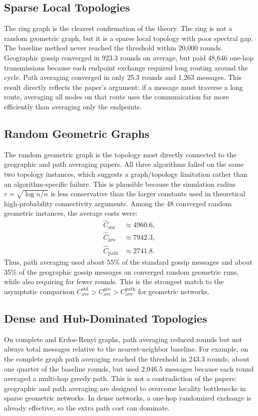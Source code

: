 \documentclass[conference]{IEEEtran}
\begin{document}
\subsection{Sparse Local Topologies}
The ring graph is the clearest confirmation of the theory. The ring is not a random geometric graph, but it is a sparse local topology with poor spectral gap. The baseline method never reached the threshold within 20,000 rounds. Geographic gossip converged in 923.3 rounds on average, but paid 48,646 one-hop transmissions because each endpoint exchange required long routing around the cycle. Path averaging converged in only 25.3 rounds and 1,263 messages. This result directly reflects the paper's argument: if a message must traverse a long route, averaging all nodes on that route uses the communication far more efficiently than averaging only the endpoints.

\subsection{Random Geometric Graphs}
The random geometric graph is the topology most directly connected to the geographic and path averaging papers. All three algorithms failed on the same two topology instances, which suggests a graph/topology limitation rather than an algorithm-specific failure. This is plausible because the simulation radius $r=\sqrt{\log n/n}$ is less conservative than the larger constants used in theoretical high-probability connectivity arguments. Among the 48 converged random geometric instances, the average costs were:
\begin{equation}
\begin{aligned}
\widehat{C}_{\mathrm{std}} &\approx 4960.6,\\
\widehat{C}_{\mathrm{geo}} &\approx 7942.3,\\
\widehat{C}_{\mathrm{path}} &\approx 2741.8.
\end{aligned}
\end{equation}
Thus, path averaging used about 55\% of the standard gossip messages and about 35\% of the geographic gossip messages on converged random geometric runs, while also requiring far fewer rounds. This is the strongest match to the asymptotic comparison $C_{\mathrm{ave}}^{\mathrm{std}} > C_{\mathrm{ave}}^{\mathrm{geo}} > C_{\mathrm{ave}}^{\mathrm{path}}$ for geometric networks.

\subsection{Dense and Hub-Dominated Topologies}
On complete and Erdos-Renyi graphs, path averaging reduced rounds but not always total messages relative to the nearest-neighbor baseline. For example, on the complete graph path averaging reached the threshold in 243.3 rounds, about one quarter of the baseline rounds, but used 2,046.5 messages because each round averaged a multi-hop greedy path. This is not a contradiction of the papers: geographic and path averaging are designed to overcome locality bottlenecks in sparse geometric networks. In dense networks, a one-hop randomized exchange is already effective, so the extra path cost can dominate.
\end{document}
